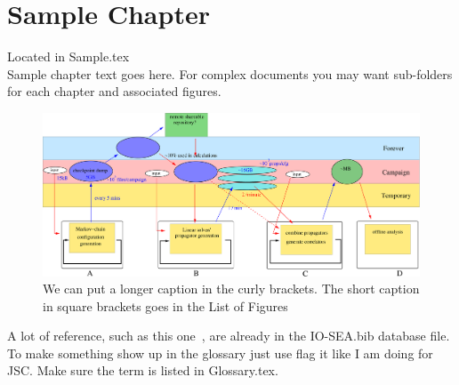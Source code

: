\chapter{Sample Chapter}\label{chap:Sample}
{\color{blue} Located in {\ttfamily Sample.tex}}\\





Sample chapter text goes here.  For complex documents you may want sub-folders for each chapter and associated figures. 



\begin{figure}[ht]
    \centering
    \includegraphics[width=\textwidth]{FIGS/lqcd_workflow.pdf}
    \caption[The LQCD workflow]{ We can put a longer caption in the curly brackets. The short caption in square brackets goes in the List of Figures}
    \label{fig:lqcd_workflow}
\end{figure}


A lot of reference, such as this one~\cite{Edwards:2004sx}, are already in the IO-SEA.bib database file. To make something show up in the glossary just use flag it like I am doing for \Gls{JSC}. Make sure the term is listed in Glossary.tex. 